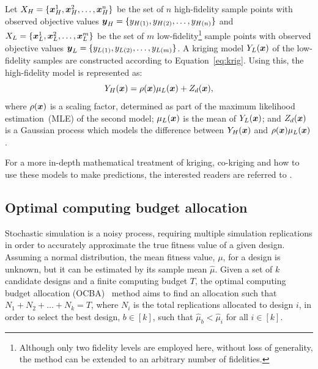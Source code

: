 Let $X_H = \{\boldsymbol{x}_H^1,\boldsymbol{x}_H^2,\dots,\boldsymbol{x}_H^n\}$ be the set of $n$ high-fidelity sample points with observed objective values $\boldsymbol{y}_H = \{y_{H(1)},y_{H(2)},\dots,y_{H(n)}\}$ and $X_L = \{\boldsymbol{x}_L^1,\boldsymbol{x}_L^2,\dots,\boldsymbol{x}_L^m\}$ be the set of $m$ low-fidelity\footnote{Although only two fidelity levels are employed here, without loss of generality, the method can be extended to an arbitrary number of fidelities.} sample points with observed objective values $\boldsymbol{y}_L = \{y_{L(1)},y_{L(2)},\dots,y_{L(m)}\}$. A kriging model $Y_L(\boldsymbol{x})$ of the low-fidelity samples are constructed according to Equation~\ref{eq:krig}. Using this, the high-fidelity model is represented as:
\begin{equation}
Y_H(\boldsymbol{x}) = \rho(\boldsymbol{x})\mu_L(\boldsymbol{x}) + Z_d(\boldsymbol{x}),
\end{equation} 
where $\rho(\boldsymbol{x})$ is a scaling factor, determined as part of the maximum likelihood estimation~(MLE) of the second model; $\mu_L(\boldsymbol{x})$ is the mean of $Y_L(\boldsymbol{x})$; and $Z_d(\boldsymbol{x})$ is a Gaussian process which models the difference between $Y_H(\boldsymbol{x})$ and $\rho(\boldsymbol{x})\mu_L(\boldsymbol{x})$.

For a more in-depth mathematical treatment of kriging, co-kriging and how to use these models to make predictions, the interested readers are referred to \cite{forrester2008engineering,forrester2007multi,kennedy2001bayesian,kennedy2000predicting}.

\subsection{Optimal computing budget allocation}
Stochastic simulation is a noisy process, requiring multiple simulation replications in order to accurately approximate the true fitness value of a given design. Assuming a normal distribution, the mean fitness value, $\mu$, for a design is unknown, but it can be estimated by its sample mean $\hat{\mu}$. 
Given a set of $k$ candidate designs and a finite computing budget $T$, the optimal computing budget allocation (OCBA)~\cite{chen2011stochastic} method aims to find an allocation such that ${N_1 + N_2 + \ldots + N_k = T}$, where $N_i$ is the total replications allocated to design $i$, in order to select the best design, $b \in [k]$, such that $\hat{\mu}_b < \hat{\mu}_i$ for all $i \in [k]$.

